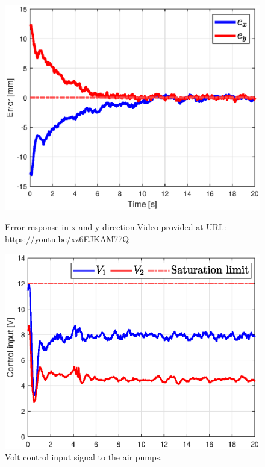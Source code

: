 \begin{figure}[H] 
    \begin{minipage}[b]{0.49\linewidth}
     \centering
    \includegraphics[width=\linewidth]{Figures/Chapter5/errrorstepleftthick.eps} 
    \caption{Error response in x and y-direction.Video provided at URL: \url{https://youtu.be/xz6EJKAM77Q}} 
    \label{fig5:errorswingleft} 
       \end{minipage} 
    \begin{minipage}[b]{0.49\linewidth}
     \centering
    \includegraphics[width=\linewidth]{Figures/Chapter5/controlinputstepleftV.eps} 
    \caption{Volt control input signal to the air pumps.} 
    \label{fig5:inputswingleft} 
    \end{minipage} 
\end{figure}



